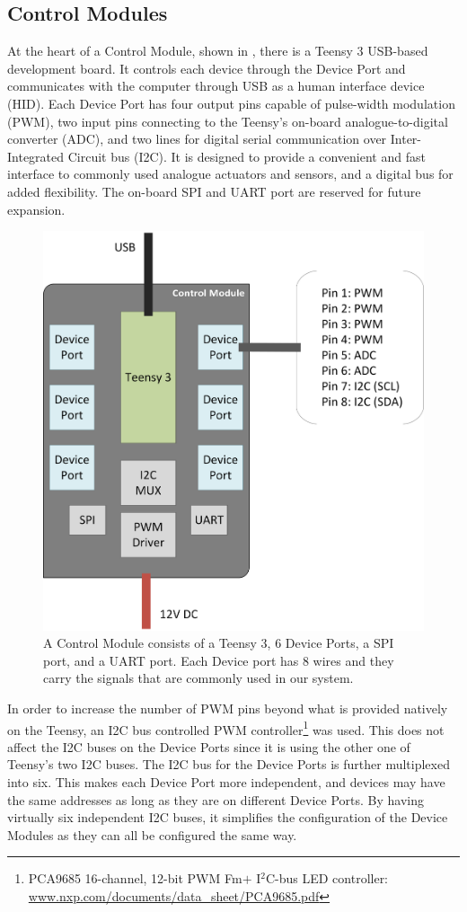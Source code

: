 \subsection{Control Modules}\label{subsec:controller}

At the heart of a Control Module, shown in , there is a Teensy 3 USB-based development board. It controls each device through the Device Port and communicates with the computer through USB as a human interface device (HID). Each Device Port has four output pins capable of pulse-width modulation (PWM), two input pins connecting to the Teensy's on-board analogue-to-digital converter (ADC), and two lines for digital serial communication over Inter-Integrated Circuit bus (I2C). It is designed to provide a convenient and fast interface to commonly used analogue actuators and sensors, and a digital bus for added flexibility. The on-board SPI and UART port are reserved for future expansion.

\begin{figure}[!htb]
	\centering
	\includegraphics[width=0.68 \textwidth]{"fig/interactive control system/Control_Module"}
	\caption[Block diagram of the Control Module]{A Control Module consists of a Teensy 3, 6 Device Ports, a SPI port, and a UART port. Each Device port has 8 wires and they carry the signals that are commonly used in our system.}
	\label{fig:Control_Module}
\end{figure}

In order to increase the number of PWM pins beyond what is provided natively on the Teensy, an I2C bus controlled PWM controller\footnote{PCA9685 16-channel, 12-bit PWM Fm$+$ I$^2$C-bus LED controller: \url{www.nxp.com/documents/data_sheet/PCA9685.pdf}} was used. This does not affect the I2C buses on the Device Ports since it is using the other one of Teensy's two I2C buses. The I2C bus for the Device Ports is further multiplexed into six. This makes each Device Port more independent, and devices may have the same addresses as long as they are on different Device Ports. By having virtually six independent I2C buses, it simplifies the configuration of the Device Modules as they can all be configured the same way.

